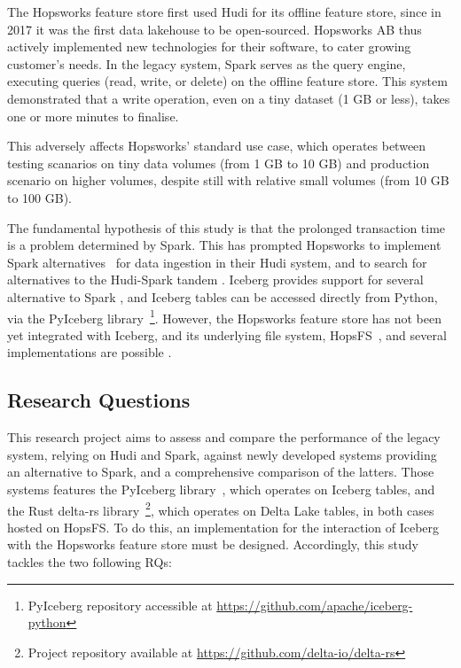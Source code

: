 The Hopsworks feature store \cite{10.1145/3626246.3653389} first used Hudi for its offline feature store, since in 2017 it was the first data lakehouse to be open-sourced. Hopsworks AB thus actively implemented new technologies for their software, to cater growing customer's needs. In the legacy system, Spark serves as the query engine, executing queries (read, write, or delete) on the offline feature store. This system demonstrated that a write operation, even on a tiny dataset (1 GB or less), takes one or more minutes to finalise.

This adversely affects Hopsworks' standard use case, which operates between testing scanarios on tiny data volumes (from 1 GB to 10 GB) and production scenario on higher volumes, despite still with relative small volumes (from 10 GB to 100 GB).

The fundamental hypothesis of this study is that the prolonged transaction time is a problem determined by Spark. This has prompted Hopsworks to implement Spark alternatives~\cite{Khazanchi1801362} for data ingestion in their Hudi system, and to search for alternatives to the Hudi-Spark tandem \cite{manfrediReducingReadWrite2024}.
Iceberg provides support for several alternative to Spark \cite{OngoingEvolutionTableFormat}, and Iceberg tables can be accessed directly from Python, via the PyIceberg library~\footnote{PyIceberg repository accessible at \url{https://github.com/apache/iceberg-python}}.
However, the Hopsworks feature store has not been yet integrated with Iceberg, and its underlying file system, \gls{HopsFS}~\cite{niaziHopsFSScalingHierarchical2017}, and several implementations are possible \cite{shiranApacheIcebergDefinitive2024}.


\subsection{Research Questions} 
\label{subsec:research_questions}

This research project aims to assess and compare the performance of the legacy system, relying on Hudi and Spark, against newly developed systems providing an alternative to Spark, and a comprehensive comparison of the latters. Those systems features the PyIceberg library~\footnotemark[\value{footnote}], which operates on Iceberg tables, and the Rust delta-rs library~\footnote{Project repository available at \url{https://github.com/delta-io/delta-rs}}, which operates on Delta Lake tables, in both cases hosted on \gls{HopsFS}. To do this, an implementation for the interaction of Iceberg with the Hopsworks feature store must be designed. Accordingly, this study tackles the two following \glspl{RQ}:

